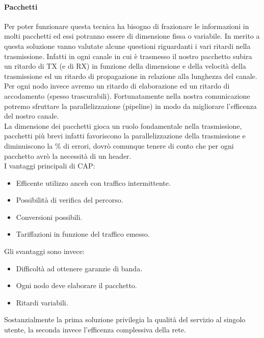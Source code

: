 \documentclass[12pt]{article}
\begin{document}
\paragraph{Pacchetti}
Per poter funzionare questa tecnica ha bisogno di frazionare le informazioni in molti pacchetti ed essi potranno essere di dimensione fissa o variabile. In merito a questa soluzione vanno valutate alcune questioni riguardanti i vari ritardi nella trasmissione. Infatti in ogni canale in cui è trasmesso il nostro pacchetto subira un ritardo di TX (e di RX) in funzione della dimensione e della velocità della trasmissione ed un ritardo di propagazione in relazione alla lunghezza del canale.\\
Per ogni nodo invece avremo un ritardo di elaborazione ed un ritardo di accodamento (spesso trascurabili). Fortunatamente nella nostra comunicazione potremo sfruttare la parallelizzazione (pipeline) in modo da migliorare l'efficenza del nostro canale.\\
La dimensione dei pacchetti gioca un ruolo fondamentale nella trasmissione, pacchetti più brevi infatti favoriscono la parallelizzazione della trasmissione e diminuiscono la \% di errori, dovrò comunque tenere di conto che per ogni pacchetto avrò la necessità di un header.\\
I vantaggi principali di CAP:
\begin{itemize}
  \item Efficente utilizzo anceh con traffico intermittente.
  \item Possibilità di verifica del percorso.
  \item Conversioni possibili.
  \item Tariffazioni in funzione del traffico emesso.
\end{itemize}
Gli svantaggi sono invece:
\begin{itemize}
  \item Difficoltà ad ottenere garanzie di banda.
  \item Ogni nodo deve elaborare il pacchetto.
  \item Ritardi variabili.
\end{itemize}
Sostanzialmente la prima soluzione privilegia la qualità del servizio al singolo utente, la seconda invece l'efficenza complessiva della rete.\\
\end{document}
